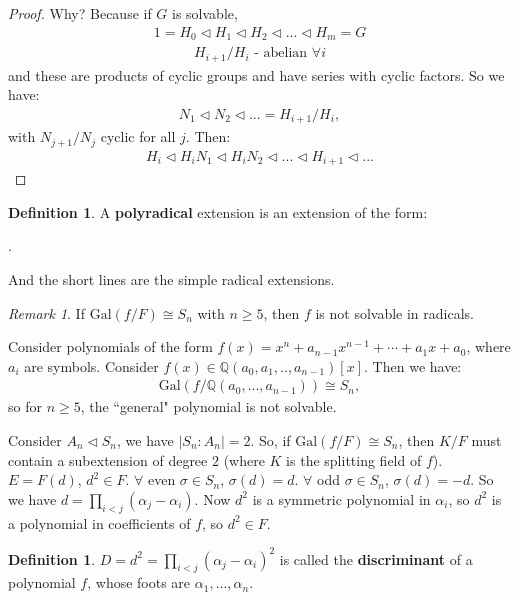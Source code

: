 \documentclass[9pt,reqno,twoside]{amsbook}
\theoremstyle{plain}
\numberwithin{section}{chapter}
\numberwithin{equation}{chapter}
\theoremstyle{definition}
\newtheorem{Def}[theorem]{Definition}
\theoremstyle{remark}
\newtheorem{rem}[theorem]{Remark}
\theoremstyle{plain}
\newcommand{\propnorm}{\triangleleft}
\newcommand{\Q}{\mathbb{Q}}
\newcommand{\bee}{\begin{equation}\begin{aligned}}
\newcommand{\eee}{\end{aligned}\end{equation}}
\newcommand{\gal}{\mathrm{Gal}}
\renewcommand{\geq}{\geqslant}
\begin{document}
\begin{proof}
Why? Because if $G$ is solvable,
\bee
1 = H_0 \propnorm H_1 \propnorm H_2 \propnorm ... \propnorm H_m = G
\eee
\bee
H_{i + 1}/H_i\text{ - abelian } \forall i
\eee
and these are products of cyclic groups and have series with cyclic factors. So we have:
\bee
N_1 \propnorm N_2 \propnorm ... = H_{i + 1}/H_i,
\eee
with $N_{j + 1}/N_j$ cyclic for all $j$. Then:
\bee
H_i \propnorm H_iN_1 \propnorm H_iN_2 \propnorm ...\propnorm H_{i+ 1} \propnorm...
\eee
\end{proof}

\begin{Def}
A \textbf{polyradical }extension is an extension of the form:
\begin{center}
.
\end{center}
And the short lines are the simple radical extensions. 
\end{Def}

\begin{rem}
If $\gal(f/F) \cong S_n$ with $n \geq 5$, then $f$ is not solvable in radicals. 
\end{rem}

Consider polynomials of the form $f(x) = x^n + a_{n - 1}x^{n - 1} + \cdots + a_1x + a_0$, where $a_i$ are symbols. Consider $f(x) \in \Q(a_0,a_1,..,a_{n - 1})[x]$. Then we have:
\bee
\gal(f/\Q(a_0,...,a_{n - 1})) \cong S_n,
\eee
so for $n \geq 5$, the ``general" polynomial is not solvable. 

Consider $A_n \propnorm S_n$, we have $|S_n:A_n| = 2$. So, if $\gal(f/F) \cong S_n$, then $K/F$ must contain a subextension of degree $2$ (where $K$ is the splitting field of $f$). $E = F(d)$, $d^2 \in F$.  $\forall$ even $ \sigma \in S_n$, $\sigma(d) = d$. $\forall $ odd $\sigma \in S_n$, $\sigma(d) = -d$. So we have $d = \prod_{i<j}(\alpha_j - \alpha_i)$. Now $d^2$ is a symmetric polynomial in $\alpha_i$, so $d^2$ is a polynomial in coefficients of $f$, so $d^2 \in F$. 

\begin{Def}
$D = d^2 = \prod_{i < j}(\alpha_j - \alpha_i)^2$ is called the \textbf{discriminant} of a polynomial $f$, whose foots are $\alpha_1,...,\alpha_n$. 
\end{Def}
\end{document}
